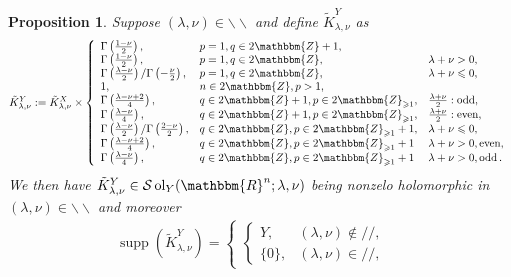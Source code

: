 \documentclass{article}
\newcommand{\assign}{:=}
\newcommand{\nin}{\not\in}
\newcommand{\tmop}[1]{\ensuremath{\operatorname{#1}}}
\newtheorem{proposition}{Proposition}[section]
\theoremstyle{remark}
\begin{document}
\begin{proposition}
  \label{supp-sing:prop-supp-Y}Suppose $(\lambda, \nu) \in
  \backslash\backslash$ and define $\tilde{K}_{\lambda, \nu}^Y$ as
  \[ \tilde{K}^Y_{\lambda, \nu} \assign \tilde{K}_{\lambda, \nu}^X \times
     \left\{ \begin{array}{lll}
       \Gamma \left( \frac{1 - \nu}{2} \right), & p = 1, q \in 2\mathbbm{Z}+
       1, & \\
       \Gamma \left( \frac{1 - \nu}{2} \right), & p = 1, q \in 2\mathbbm{Z}, &
       \lambda + \nu > 0,\\
       \Gamma \left( \frac{\lambda - \nu}{2} \right) / \Gamma \left( -
       \frac{\nu}{2} \right), & p = 1, q \in 2\mathbbm{Z}, & \lambda + \nu
       \leqslant 0,\\
       1, & n \in 2\mathbbm{Z}, p > 1, & \\
       \Gamma \left( \frac{\lambda - \nu + 2}{4} \right), & q \in
       2\mathbbm{Z}+ 1, p \in 2\mathbbm{Z}_{\geqslant 1}, & \frac{\lambda +
       \nu}{2} : \tmop{odd},\\
       \Gamma \left( \frac{\lambda - \nu}{4} \right), & q \in 2\mathbbm{Z}+ 1,
       p \in 2\mathbbm{Z}_{\geqslant 1}, & \frac{\lambda + \nu}{2} :
       \tmop{even},\\
       \Gamma \left( \frac{\lambda - \nu}{2} \right) / \Gamma \left( \frac{2 -
       \nu}{2} \right), & q \in 2\mathbbm{Z}, p \in 2\mathbbm{Z}_{\geqslant 1}
       + 1, & \lambda + \nu \leqslant 0,\\
       \Gamma \left( \frac{\lambda - \nu + 2}{4} \right), & q \in
       2\mathbbm{Z}, p \in 2\mathbbm{Z}_{\geqslant 1} + 1 & \lambda + \nu > 0,
       \tmop{even},\\
       \Gamma \left( \frac{\lambda - \nu}{4} \right), & q \in 2\mathbbm{Z}, p
       \in 2\mathbbm{Z}_{\geqslant 1} + 1 & \lambda + \nu > 0, \tmop{odd} .
     \end{array} \right. \]
  We then have $\tilde{K}^Y_{\lambda, \nu} \in \mathcal{S} \tmop{ol}_Y
  (\mathbbm{R}^n ; \lambda, \nu)$ being nonzelo holomorphic in $ (\lambda,
  \nu) \in \backslash\backslash$ and moreover
  \begin{eqnarray}
    & \tmop{supp} (\tilde{K}_{\lambda, \nu}^Y) = \left\{ \begin{array}{ll}
      \left\{ \begin{array}{ll}
        Y, & (\lambda, \nu) \nin / /,\\
        \{ 0 \}, & (\lambda, \nu) \in / /,
      \end{array} \right. & \begin{array}{c}

\end{array}
\end{array}
\end{eqnarray}
\end{proposition}
\end{document}
